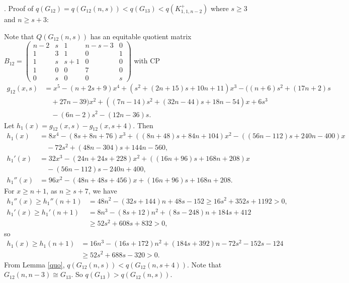 \documentclass[12pt]{article}
\begin{document}
\begin{appendices}
. Proof of $q(G_{12})=q(G_{12}(n,s))<q(G_{13})<q(K_{1,1,n-2}^+)$ where $s\ge 3$ and $n\ge s+3$:

Note that  $Q(G_{12}(n,s))$ has an equitable quotient matrix
$
B_{12}=
\left(\begin{smallmatrix}
n-2 & s & 1&  n-s-3 & 0\\
1 &3 & 1 & 0 &1\\
1 & s & s+1 & 0 & 0\\
1 & 0 & 0 &7 &0\\
0 &s  &0 &0 &s
\end{smallmatrix}\right)$
with CP
\begin{align*}
g_{12}(x,s)&=x^5 - ( n +2s + 9)x^4 + (s^2 + (2n + 15)s + 10n + 11)x^3 - (( n + 6)s^2+ (17n+2)s\\
&\quad +27n- 39)x^2+ ((7n - 14)s^2 + (32n - 44)s +18n -54)x+ 6s^3 \\
&\quad - (6n-2)s^2- ( 12n-36)s.
\end{align*}
Let $h_1(x)=g_{12}(x,s)-g_{12}(x,s+4)$. Then
\begin{align*}
h_1(x)&=8x^4 - ( 8s + 8n + 76)x^3 + ((8n + 48)s + 84n + 104)x^2-((56n-112)s + 240n- 400)x\\
&\quad - 72s^2 + (48n - 304)s + 144n - 560,\\
h_1'(x)&=32x^3 - ( 24n + 24s + 228)x^2 + ((16n + 96)s + 168n + 208)x \\
&\quad -(56n-112)s- 240n + 400,\\
h_1''(x)&=96x^2 - ( 48n +48s + 456)x + (16n + 96)s + 168n + 208.
\end{align*}
For  $x\ge n+1$, as $n\ge s+7$, we have
\begin{align*}
h_1''(x)\ge h_1''(n+1)&=48n^2 - ( 32s + 144)n + 48s - 152\ge 16s^2 + 352s + 1192>0,\\
h_1'(x)\ge h_1'(n+1)&=8n^3 - ( 8s + 12)n^2 + (8s - 248)n + 184s + 412\\
&\ge  52s^2 + 608s + 832>0,
\end{align*}
so
\begin{align*}
h_1(x)\ge h_1(n+1)&=16n^3 - ( 16s + 172)n^2 + (184s + 392)n - 72s^2 - 152s -124\\
&\ge  52s^2 + 688s - 320>0.
\end{align*}
From Lemma \ref{quo}, $q(G_{12}(n,s))<q(G_{12}(n,s+4))$.
Note that $G_{12}(n,n-3)\cong G_{13}$.
So $q(G_{13})>q(G_{12}(n,s))$.


\end{appendices}
\end{document}
